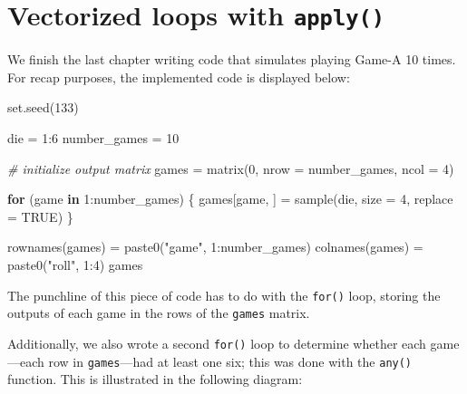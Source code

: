 \documentclass[
]{book}
\newenvironment{Shaded}{\begin{snugshade}}{\end{snugshade}}
\newcommand{\AttributeTok}[1]{\textcolor[rgb]{0.77,0.63,0.00}{#1}}
\newcommand{\CommentTok}[1]{\textcolor[rgb]{0.56,0.35,0.01}{\textit{#1}}}
\newcommand{\ConstantTok}[1]{\textcolor[rgb]{0.00,0.00,0.00}{#1}}
\newcommand{\ControlFlowTok}[1]{\textcolor[rgb]{0.13,0.29,0.53}{\textbf{#1}}}
\newcommand{\DecValTok}[1]{\textcolor[rgb]{0.00,0.00,0.81}{#1}}
\newcommand{\FunctionTok}[1]{\textcolor[rgb]{0.00,0.00,0.00}{#1}}
\newcommand{\NormalTok}[1]{#1}
\newcommand{\OtherTok}[1]{\textcolor[rgb]{0.56,0.35,0.01}{#1}}
\newcommand{\SpecialCharTok}[1]{\textcolor[rgb]{0.00,0.00,0.00}{#1}}
\newcommand{\StringTok}[1]{\textcolor[rgb]{0.31,0.60,0.02}{#1}}
\begin{document}
\hypertarget{vectorized-loops-with-apply}{%
\chapter{\texorpdfstring{Vectorized loops with \texttt{apply()}}{Vectorized loops with apply()}}\label{vectorized-loops-with-apply}}

We finish the last chapter writing code that simulates playing Game-A 10 times.
For recap purposes, the implemented code is displayed below:

\begin{Shaded}
\begin{Highlighting}[]
\FunctionTok{set.seed}\NormalTok{(}\DecValTok{133}\NormalTok{)}

\NormalTok{die }\OtherTok{=} \DecValTok{1}\SpecialCharTok{:}\DecValTok{6}
\NormalTok{number\_games }\OtherTok{=} \DecValTok{10}

\CommentTok{\# initialize output matrix}
\NormalTok{games }\OtherTok{=} \FunctionTok{matrix}\NormalTok{(}\DecValTok{0}\NormalTok{, }\AttributeTok{nrow =}\NormalTok{ number\_games, }\AttributeTok{ncol =} \DecValTok{4}\NormalTok{)}

\ControlFlowTok{for}\NormalTok{ (game }\ControlFlowTok{in} \DecValTok{1}\SpecialCharTok{:}\NormalTok{number\_games) \{}
\NormalTok{  games[game, ] }\OtherTok{=} \FunctionTok{sample}\NormalTok{(die, }\AttributeTok{size =} \DecValTok{4}\NormalTok{, }\AttributeTok{replace =} \ConstantTok{TRUE}\NormalTok{)}
\NormalTok{\}}

\FunctionTok{rownames}\NormalTok{(games) }\OtherTok{=} \FunctionTok{paste0}\NormalTok{(}\StringTok{"game"}\NormalTok{, }\DecValTok{1}\SpecialCharTok{:}\NormalTok{number\_games)}
\FunctionTok{colnames}\NormalTok{(games) }\OtherTok{=} \FunctionTok{paste0}\NormalTok{(}\StringTok{"roll"}\NormalTok{, }\DecValTok{1}\SpecialCharTok{:}\DecValTok{4}\NormalTok{)}
\NormalTok{games}
\end{Highlighting}
\end{Shaded}

The punchline of this piece of code has to do with the \texttt{for()} loop, storing
the outputs of each game in the rows of the \texttt{games} matrix.

Additionally, we also wrote a second \texttt{for()} loop to determine whether each
game---each row in \texttt{games}---had at least one six; this was done with the
\texttt{any()} function. This is illustrated in the following diagram:
\end{document}
